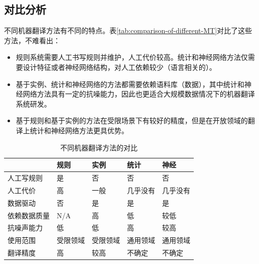 
\subsection{对比分析}

\parinterval 不同机器翻译方法有不同的特点。表\ref{tab:comparison-of-different-MT}对比了这些方法，不难看出：

\begin{itemize}
\vspace{0.5em}
\item 规则系统需要人工书写规则并维护，人工代价较高。统计和神经网络方法仅需要设计特征或者神经网络结构，对人工依赖较少（语言相关的）。
\vspace{0.5em}
\item 基于实例、统计和神经网络的方法都需要依赖语料库（数据），其中统计和神经网络方法具有一定的抗噪能力，因此也更适合大规模数据情况下的机器翻译系统研发。
\vspace{0.5em}
\item 基于规则和基于实例的方法在受限场景下有较好的精度，但是在开放领域的翻译上统计和神经网络方法更具优势。
\vspace{0.5em}
\end{itemize}

\begin{table}[htp]{
\begin{center}
\caption{不同机器翻译方法的对比}
\label{tab:comparison-of-different-MT}
\begin{tabular}{l | l l l l}
& \parbox{3.8em}{规则} & \parbox{3.8em}{实例} & \parbox{3.8em}{统计} & \parbox{3.8em}
{神经} \\
\hline

人工写规则 & 是 & 否 & 否 & 否\\
人工代价 & 高 & 一般 & 几乎没有 & 几乎没有 \\
数据驱动 & 否 & 是 & 是 & 是\\
依赖数据质量 & N/A & 高 & 低 & 较低\\
抗噪声能力 & 低 & 低 & 高 & 较高 \\
使用范围 & 受限领域 & 受限领域 & 通用领域 & 通用领域 \\
翻译精度 & 高 & 较高 & 不确定 & 不确定 \\
\end{tabular}
\end{center}
\label{tab:1-1}
}\end{table}


